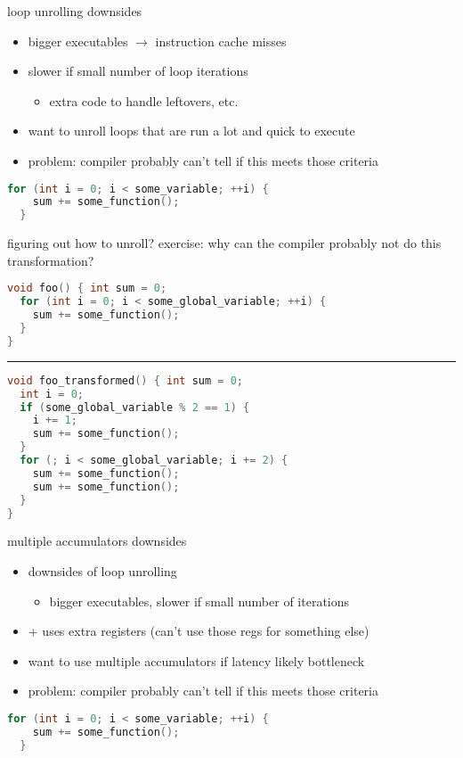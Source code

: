\begin{frame}[fragile,label=loopUnrollDown]{loop unrolling downsides}
    \begin{itemize}
    \item bigger executables $\rightarrow$ instruction cache misses
    \item slower if small number of loop iterations
        \begin{itemize}
        \item extra code to handle leftovers, etc.
        \end{itemize}
    \vspace{.5cm}
    \item want to unroll loops that are run a lot and quick to execute
    \item problem: compiler probably can't tell if this meets those criteria
    \end{itemize}
\begin{lstlisting}[language=C,style=small]
  for (int i = 0; i < some_variable; ++i) {
    sum += some_function();
  }
\end{lstlisting}
\end{frame}

\begin{frame}[fragile,label=loopUnrollDiff]{figuring out how to unroll?}
exercise: why can the compiler probably not do this transformation?
\begin{lstlisting}[language=C,style=smaller]
void foo() { int sum = 0;
  for (int i = 0; i < some_global_variable; ++i) {
    sum += some_function();
  }
}
\end{lstlisting}
\hrule
\begin{lstlisting}[language=C,style=smaller]
void foo_transformed() { int sum = 0;
  int i = 0;
  if (some_global_variable % 2 == 1) {
    i += 1;
    sum += some_function();
  }
  for (; i < some_global_variable; i += 2) {
    sum += some_function();
    sum += some_function();
  }
}
\end{lstlisting}
\end{frame}

\begin{frame}[fragile,label=multAccDown]{multiple accumulators downsides}
    \begin{itemize}
    \item downsides of loop unrolling 
        \begin{itemize}
        \item bigger executables, slower if small number of iterations
        \end{itemize}
    \item + uses extra registers (can't use those regs for something else)
    \vspace{.5cm}
    \item want to use multiple accumulators if latency likely bottleneck
    \item problem: compiler probably can't tell if this meets those criteria
    \end{itemize}
\begin{lstlisting}[language=C,style=small]
  for (int i = 0; i < some_variable; ++i) {
    sum += some_function();
  }
\end{lstlisting}
\end{frame}
